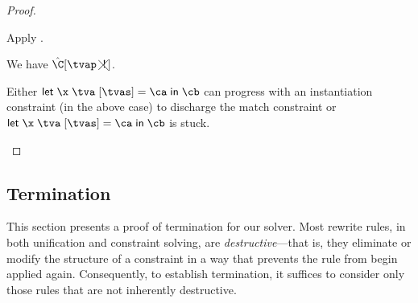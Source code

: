 \documentclass[acmsmall,screen,nonacm,review]{acmart}
\begin{document}
\begin{proof}
\begin{proofcases}
\begin{proofcases}
\begin{proofcases}
\begin{itemize}
		\proofcase{$\tvp \notin \reg \tv \tvs$} Apply .




	    \end{itemize}

	   We have $\nCshape {\hat\C} \tvp$.

	  Either $\cletr \x \tv \tvs \ca \cb$ can progress with an instantiation constraint (in the above case) to discharge
	  the match constraint or $\cletr \x \tv \tvs \ca \cb$ is stuck.
	\end{proofcases}

    \end{proofcases}


  \end{proofcases}
\end{proof}

\subsection{Termination}

This section presents a proof of termination for our solver.
%
Most rewrite rules, in both unification and constraint solving, are
\emph{destructive}---that is, they eliminate or modify the structure of a
constraint in a way that prevents the rule from begin applied again.
%
Consequently, to establish termination, it suffices to consider only those
rules that are not inherently destructive.
\end{document}
